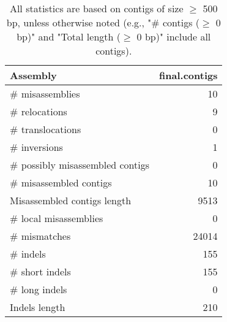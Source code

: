 \documentclass[12pt,a4paper]{article}
\begin{document}
\begin{table}[ht]
\begin{center}
\caption{All statistics are based on contigs of size $\geq$ 500 bp, unless otherwise noted (e.g., "\# contigs ($\geq$ 0 bp)" and "Total length ($\geq$ 0 bp)" include all contigs).}
\begin{tabular}{|l*{1}{|r}|}
\hline
Assembly & final.contigs \\ \hline
\# misassemblies & 10 \\ \hline
\hspace{5mm}\# relocations & 9 \\ \hline
\hspace{5mm}\# translocations & 0 \\ \hline
\hspace{5mm}\# inversions & 1 \\ \hline
\# possibly misassembled contigs & 0 \\ \hline
\# misassembled contigs & 10 \\ \hline
Misassembled contigs length & 9513 \\ \hline
\# local misassemblies & 0 \\ \hline
\# mismatches & 24014 \\ \hline
\# indels & 155 \\ \hline
\hspace{5mm}\# short indels & 155 \\ \hline
\hspace{5mm}\# long indels & 0 \\ \hline
Indels length & 210 \\ \hline
\end{tabular}
\end{center}
\end{table}
\end{document}
